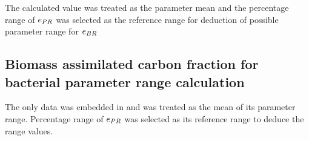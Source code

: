 \documentclass[../thesis.tex]{subfiles} %
\begin{document}
The calculated value was treated as the parameter mean and the percentage range of $e_{PR}$ was selected as the reference range for deduction of possible parameter range for $e_{BR}$

\subsection{Biomass assimilated carbon fraction for bacterial parameter range calculation}
The only data was embedded in \autocite{cochran1988estimation} and was treated as the mean of its parameter range.  Percentage range of $e_{PR}$ was selected as its reference range to deduce the range values.
\end{document}
